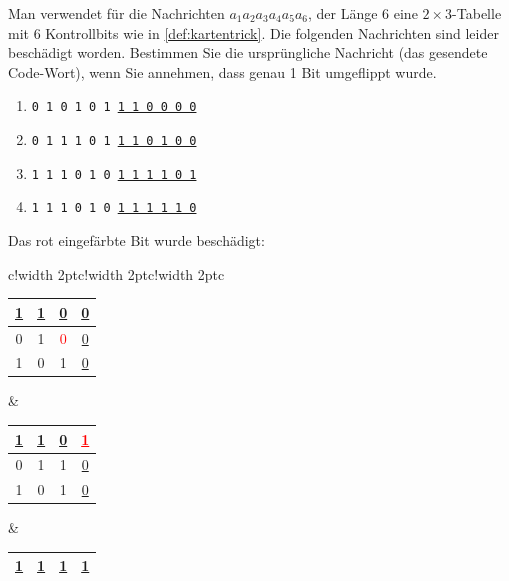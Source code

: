 \begin{myexercise}
    Man verwendet für die Nachrichten $a_1a_2a_3a_4a_5a_6$, der Länge 6 eine $2 \times 3$-Tabelle mit 6 Kontrollbits wie in \cref{def:kartentrick}. Die folgenden Nachrichten sind leider beschädigt worden. Bestimmen Sie die ursprüngliche Nachricht (das gesendete Code-Wort), wenn Sie annehmen, dass genau 1 Bit umgeflippt wurde.

    \begin{enumerate}
        \item \texttt{0 1 0 1 0 1 \underline{1 1 0 0 0 0}}
        \item \texttt{0 1 1 1 0 1 \underline{1 1 0 1 0 0}}
        \item \texttt{1 1 1 0 1 0 \underline{1 1 1 1 0 1}}
        \item \texttt{1 1 1 0 1 0 \underline{1 1 1 1 1 0}}
    \end{enumerate}
    \begin{myanswer}
        Das rot eingefärbte Bit wurde beschädigt:
        \begin{table}[H]
            \centering
            \begin{tabular}{c!{\color{red}\vrule width 2pt}c!{\color{red}\vrule width 2pt}c!{\color{red}\vrule width 2pt}c}
                \begin{tabular}{c|c|c||c}
                    \underline{1} & \underline{1} & \underline{0}      & \underline{0} \\ \midrule\midrule
                    0             & 1             & \textcolor{red}{0} & \underline{0} \\ \midrule
                    1             & 0             & 1                  & \underline{0} \\
                \end{tabular}                       &
                \begin{tabular}{c|c|c||c}
                    \underline{1} & \underline{1} & \underline{0} & \textcolor{red}{\underline{1}} \\ \midrule\midrule
                    0             & 1             & 1             & \underline{0}                  \\ \midrule
                    1             & 0             & 1             & \underline{0}                  \\
                \end{tabular} &
                \begin{tabular}{c|c|c||c}
                    \underline{1} & \underline{1}      & \underline{1} & \underline{1} \\ \midrule\midrule

\end{tabular}
\end{tabular}
\end{table}
\end{myanswer}
\end{myexercise}
